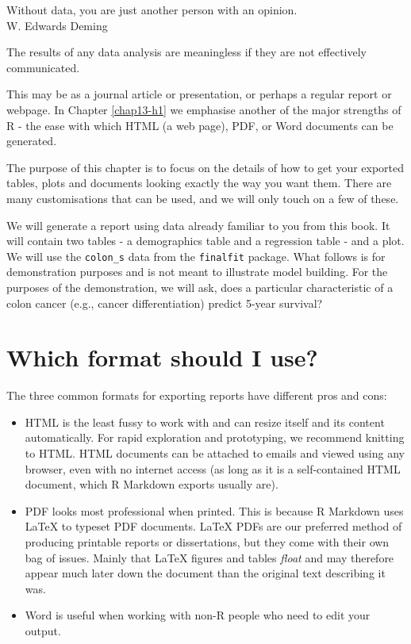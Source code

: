 \documentclass[
  12pt,
  krantz2]{krantz}
\providecommand{\tightlist}{%
  \setlength{\itemsep}{0pt}\setlength{\parskip}{0pt}}
\renewenvironment{quote}{\begin{VF}}{\end{VF}}
\begin{document}

\begin{quote}
Without data, you are just another person with an opinion.\\
W. Edwards Deming
\end{quote}

The results of any data analysis are meaningless if they are not effectively communicated.

This may be as a journal article or presentation, or perhaps a regular report or webpage. In Chapter \ref{chap13-h1} we emphasise another of the major strengths of R - the ease with which HTML (a web page), PDF, or Word documents can be generated.

The purpose of this chapter is to focus on the details of how to get your exported tables, plots and documents looking exactly the way you want them. There are many customisations that can be used, and we will only touch on a few of these.

We will generate a report using data already familiar to you from this book.
It will contain two tables - a demographics table and a regression table - and a plot.
We will use the \texttt{colon\_s} data from the \texttt{finalfit} package.
What follows is for demonstration purposes and is not meant to illustrate model building.
For the purposes of the demonstration, we will ask, does a particular characteristic of a colon cancer (e.g., cancer differentiation) predict 5-year survival?

\hypertarget{which-format-should-i-use}{%
\section{Which format should I use?}\label{which-format-should-i-use}}

The three common formats for exporting reports have different pros and cons:

\begin{itemize}
\tightlist
\item
  HTML is the least fussy to work with and can resize itself and its content automatically. For rapid exploration and prototyping, we recommend knitting to HTML. HTML documents can be attached to emails and viewed using any browser, even with no internet access (as long as it is a self-contained HTML document, which R Markdown exports usually are).
\item
  PDF looks most professional when printed. This is because R Markdown uses LaTeX to typeset PDF documents. LaTeX PDFs are our preferred method of producing printable reports or dissertations, but they come with their own bag of issues. Mainly that LaTeX figures and tables \emph{float} and may therefore appear much later down the document than the original text describing it was.
\item
  Word is useful when working with non-R people who need to edit your output.
\end{itemize}
\end{document}

